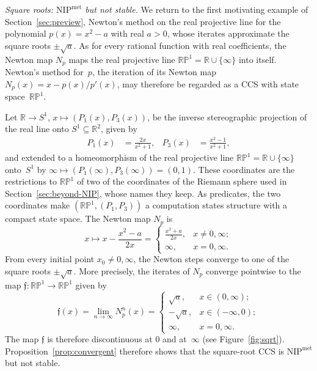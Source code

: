 \documentclass[psamsfonts]{amsart}
\theoremstyle{definition}
\theoremstyle{remark}
\newcommand{\NIP}{\text{NIP}}
\newcommand{\RP}{\mathbb{R}\mathbb{P}}
\numberwithin{equation}{section}
\begin{document}
\emph{Square roots: $\NIP^{\mathrm{met}}$ but not stable.}\label{exa:square-roots-compute}
We return to the first motivating example of Section~\ref{sec:preview}, Newton's method on the real projective line for the polynomial $p(x)=x^2-a$ with real $a>0$, whose iterates approximate the square roots $\pm\sqrt a$.
As for every rational function with real coefficients, the Newton map $N_p$ maps the real projective line $\RP^1 = \mathbb{R}\cup\{\infty\}$ into itself.
Newton's method for~$p$, the iteration of its Newton map $N_p(x)=x-p(x)/p'(x)$, may therefore be regarded as a CCS with state space~$\RP^1$.

Let $\mathbb{R}\to S^1$, $x\mapsto (P_1(x),P_3(x))$, be the inverse stereographic projection of the real line onto $S^1\subseteq \mathbb{R}^2$, given by
\begin{align*}
P_1(x) & = \frac{2x}{x^2+1},    &
P_3(x) & = \frac{x^2-1}{x^2+1},
\end{align*}
and extended to a homeomorphism of the real projective line $\RP^1 = \mathbb{R}\cup\{\infty\}$ onto~$S^1$ by $\infty \mapsto (P_1(\infty), P_3(\infty)) = (0, 1)$.
These coordinates are the restrictions to $\RP^1$ of two of the coordinates of the Riemann sphere used in Section~\ref{sec:beyond-NIP}, whose names they keep.
As predicates, the two coordinates make $(\RP^1, (P_1, P_3))$ a computation states structure with a compact state space.
The Newton map $N_p$ is
\begin{equation*}
x \mapsto x - \frac{x^2-a}{2x}
=
\begin{cases}
\frac{x^2+a}{2x}, & x\ne0,\infty; \\
\infty,           & x=0, \infty.
\end{cases}
\end{equation*}
From every initial point $x_0\ne0,\infty$, the Newton steps converge to one of the square roots $\pm\sqrt{a}$.
More precisely, the iterates of $N_p$ converge pointwise to the map $\mathfrak{f}\colon \RP^1\to\RP^1$ given by
\[
  \mathfrak{f}(x)
  =
  \lim_{n\rightarrow\infty}N_p^n(x)
  =
  \begin{cases}
  \sqrt{a},  & x\in(0,\infty); \\
  -\sqrt{a}, & x\in(-\infty,0); \\
  \infty,    & x = 0, \infty.
  \end{cases}
\]
The map $\mathfrak{f}$ is therefore discontinuous at $0$ and at~$\infty$ (see Figure~\ref{fig:sqrt}).
Proposition~\ref{prop:convergent} therefore shows that the square-root CCS is $\NIP^{\mathrm{met}}$ but not stable.
\end{document}
